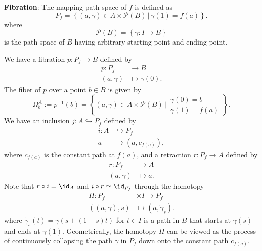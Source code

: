     \textbf{Fibration}:
    The mapping path space of $f$ is defined as
    \begin{equation*}
        P_f =\left\{(a,\gamma) \in A\times\mathcal{P}(B)\,\Big|\,
        \gamma(1) = f(a)\right\}.
    \end{equation*}
    where
    \begin{equation*}
        \mathcal{P}(B) = \left\{\gamma: I\to B\right\}
    \end{equation*}
    is the path space of $B$ having arbitrary starting point 
    and ending point.
    
    We have a fibration $p: P_f \to B$ defined by
    \begin{align*}
        p: P_f &\to B \\
        (a,\gamma) &\mapsto \gamma(0).
    \end{align*}
    The fiber of $p$ over a point $b\in B$ is given by
    \begin{equation*}
        \Omega_{b}^{A}:=p^{-1}(b)
            =\left\{(a,\gamma)\in A\times\mathcal{P}(B)\,\Bigg|\,
            \begin{array}{l}
                \gamma(0)=b \\
                \gamma(1)=f(a)
            \end{array}
            \right\}.
    \end{equation*}
    We have an inclusion $j: A\hookrightarrow P_f$ defined by
    \begin{align*}
        i:A&\hookrightarrow P_f \\
        a &\mapsto(a,c_{f(a)}),
    \end{align*}
    where $c_{f(a)}$ is the constant path at $f(a)$,
    and a retraction $r: P_f \to A$ defined by
    \begin{align*}
        r: P_f &\to A \\
        (a,\gamma) &\mapsto a.
    \end{align*}
    Note that $r\circ i = \id_A$ and $i\circ r \simeq \id_{P_f}$
    through the homotopy
    \begin{align*}
        H: P_f &\times I \to P_f \\
        ((a,\gamma),s) &\mapsto (a,\tilde{\gamma}_s).
    \end{align*}
    where $\tilde{\gamma}_s(t)=\gamma(s+(1-s)t)$ for $t\in I$ is 
    a path in $B$ that starts at $\gamma(s)$ and ends at $\gamma(1)$.
    Geometrically, the homotopy $H$ can be viewed as 
    the process of continuously collapsing 
    the path $\gamma$ in $P_f$ down onto 
    the constant path $c_{f(a)}$.


